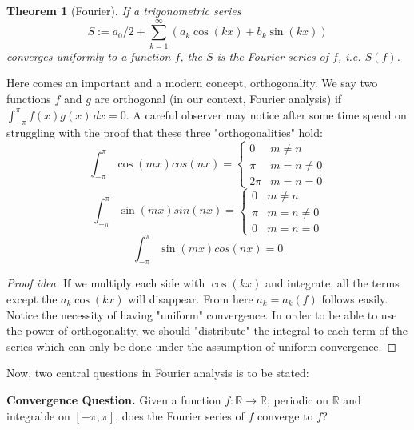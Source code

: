 \documentclass[12pt]{amsart}
\newtheorem{theorem}{Theorem}[section]
\theoremstyle{definition}
\begin{document}
\begin{theorem}[Fourier]
    If a trigonometric series
    \[
    S := a_0  / 2 +  \sum_{k = 1}^{\infty} (a_k  \cos(kx) + b_k  \sin(kx))
    \]
   converges uniformly to a function \(f\), the $S$ is the Fourier series of \(f\), i.e. $S(f)$.
\end{theorem}

    Here comes an important and a modern concept, orthogonality\footnotemark{}. We say two functions $f$ and $g$ are orthogonal (in our context, Fourier analysis) if $\int_{-\pi}^{\pi} f(x)g(x)\,dx = 0$. A careful observer may notice after some time spend on struggling with the proof that these three "orthogonalities" hold:
    \[
    \int_{-\pi}^{\pi} \cos(mx)cos(nx) = \begin{cases}
                                        0 & m \neq n \\
                                      \pi &  m = n \neq 0\\
                                     2\pi & m = n = 0
                                        \end{cases}
    \]
    \[
    \int_{-\pi}^{\pi} \sin(mx)sin(nx) = \begin{cases}
                                        0 & m \neq n \\
                                      \pi &  m = n \neq 0\\
                                        0 & m = n = 0
                                        \end{cases}
    \]
    \[
    \int_{-\pi}^{\pi} \sin(mx)cos(nx) = 0
    \]



\begin{proof}[Proof idea]
    If we multiply each side with $\cos(kx)$ and integrate, all the terms except the $a_k \cos(kx)$ will disappear. From here $a_k = a_k(f)$ follows easily. \hfill
    \indent Notice the necessity of having "uniform" convergence. In order to be able to use the power of orthogonality, we should "distribute" the integral to each term of the series which can only be done under the assumption of uniform convergence.
\end{proof}


    Now, two central questions in Fourier analysis is to be stated:

\textbf{Convergence Question.} Given a function \( f : \mathbb{R} \to \mathbb{R} \), periodic on \( \mathbb{R} \) and integrable on \( [-\pi, \pi] \), does the Fourier series of \( f \) converge to \( f \)?
\end{document}
